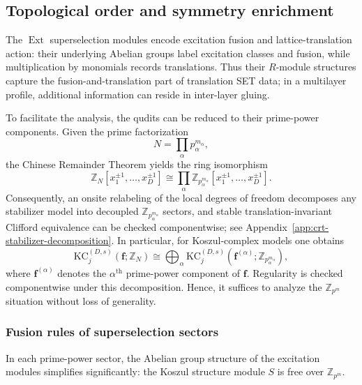\documentclass[aps,prx,english,superscriptaddress,twocolumn,tightenlines,showpacs,longbibliography,floatfix,amsfonts]{revtex4-2}
\theoremstyle{remark}
\theoremstyle{definition}
\begin{document}
\subsection{Topological order and symmetry enrichment}

The \(\operatorname{Ext}\) superselection modules encode excitation fusion and
lattice-translation action: their underlying Abelian groups label excitation
classes and fusion, while multiplication by monomials records translations.
Thus their \(R\)-module structures capture the fusion-and-translation part of
translation SET data; in a multilayer profile, additional information can
reside in inter-layer gluing.

To facilitate the analysis, the qudits can be reduced to their prime-power components. Given the prime factorization
\begin{equation}
	N=\prod_\alpha p_\alpha^{m_\alpha},
\end{equation}
the Chinese Remainder Theorem yields the ring isomorphism
\begin{equation}
	\mathbb{Z}_N[x_1^{\pm1},\dots,x_D^{\pm1}]
	\cong
	\prod_\alpha
	\mathbb{Z}_{p_\alpha^{m_\alpha}}[x_1^{\pm1},\dots,x_D^{\pm1}].
	\label{eq:CRT}
\end{equation}
Consequently, an onsite relabeling of the local degrees of freedom decomposes
any stabilizer model into decoupled $\mathbb{Z}_{p_\alpha^{m_\alpha}}$
sectors, and stable translation-invariant Clifford equivalence can be checked
componentwise; see Appendix~\ref{app:crt-stabilizer-decomposition}. In
particular, for Koszul-complex models one obtains
\begin{equation}
	\mathrm{KC}_{j}^{(D,s)}(\mathbf{f};\mathbb{Z}_N)
	\cong
	\bigoplus_\alpha
	\mathrm{KC}_{j}^{(D,s)}(\mathbf{f}^{(\alpha)};\mathbb{Z}_{p_\alpha^{m_\alpha}}),
	\label{eq:CRT-Koszul-decomposition}
\end{equation}
where $\mathbf{f}^{(\alpha)}$ denotes the $\alpha^\text{th}$ prime-power component of $\mathbf{f}$. Regularity is checked componentwise under this decomposition. Hence, it suffices to analyze the $\mathbb{Z}_{p^m}$ situation without loss of generality.

\subsubsection{Fusion rules of superselection sectors}

In each prime-power sector, the Abelian group structure of the excitation modules simplifies significantly: the Koszul structure module $S$ is free over $\mathbb{Z}_{p^m}$.
\end{document}
